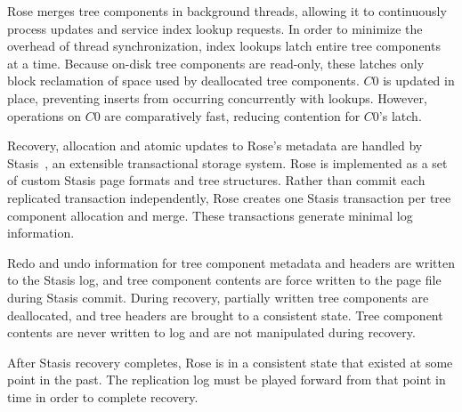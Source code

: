 \documentclass{vldb}
\newcommand{\rows}{Rose\xspace}
\newcommand{\rowss}{Rose's\xspace}
\begin{document}
\rows merges tree components in background threads, allowing
it to continuously process updates and service index lookup requests.
In order to minimize the overhead of thread synchronization, index
lookups latch entire tree components at a time.  Because on-disk tree
components are read-only, these latches only block reclamation of
space used by deallocated tree components.  $C0$ is
updated in place, preventing inserts from occurring concurrently with
lookups.  However, operations on $C0$ are comparatively
fast, reducing contention for $C0$'s latch.

Recovery, allocation and atomic updates to \rowss metadata are
handled by Stasis~\cite{stasis}, an extensible transactional storage
system.  \rows is implemented as a set of custom Stasis page formats
and tree structures.  Rather than commit each replicated transaction
independently, \rows creates one Stasis transaction per tree component
allocation and merge.  These transactions generate minimal log
information.

Redo and undo information for tree component metadata and headers are
written to the Stasis log, and tree component contents are force
written to the page file during Stasis commit.  During recovery,
partially written tree components are deallocated, and tree headers
are brought to a consistent state.  Tree component contents are never
written to log and are not manipulated during recovery.

After Stasis recovery completes, \rows is in a consistent state that
existed at some point in the past.  The replication log must be
played forward from that point in time in order to complete recovery.


\end{document}
